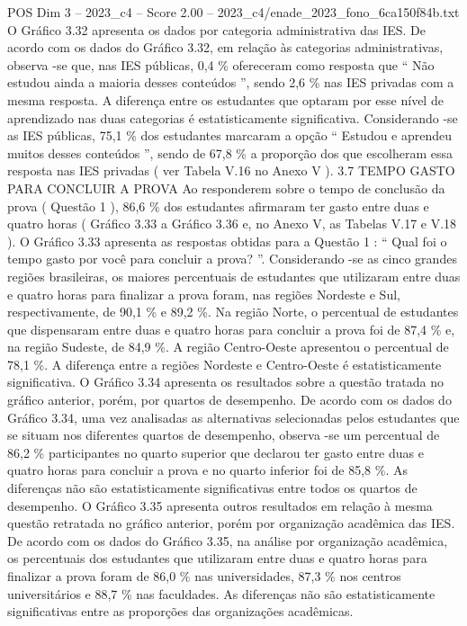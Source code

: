 \begin{textsample}{POS Dim 3 – 2023\_c4 – Score 2.00 – 2023\_c4/enade\_2023\_fono\_6ca150f84b.txt}
O Gráfico 3.32 apresenta os dados por categoria administrativa das IES.
De acordo com os dados do Gráfico 3.32, em relação às categorias administrativas, observa -se que, nas IES públicas, 0,4 \% ofereceram como resposta que “ Não estudou ainda a maioria desses conteúdos ”, sendo 2,6 \% nas IES privadas com a mesma resposta.
A diferença entre os estudantes que optaram por esse nível de aprendizado nas duas categorias é estatisticamente significativa.
Considerando -se as IES públicas, 75,1 \% dos estudantes marcaram a opção “ Estudou e aprendeu muitos desses conteúdos ”, sendo de 67,8 \% a proporção dos que escolheram essa resposta nas IES privadas ( ver Tabela V.16 no Anexo V ). 3.7 TEMPO GASTO PARA CONCLUIR A PROVA Ao responderem sobre o tempo de conclusão da prova ( Questão 1 ), 86,6 \% dos estudantes afirmaram ter gasto entre duas e quatro horas ( Gráfico 3.33 a Gráfico 3.36 e, no Anexo V, as Tabelas V.17 e V.18 ).
O Gráfico 3.33 apresenta as respostas obtidas para a Questão 1 : “ Qual foi o tempo gasto por você para concluir a prova? ”.
Considerando -se as cinco grandes regiões brasileiras, os maiores percentuais de estudantes que utilizaram entre duas e quatro horas para finalizar a prova foram, nas regiões Nordeste e Sul, respectivamente, de 90,1 \% e 89,2 \%.
Na região Norte, o percentual de estudantes que dispensaram entre duas e quatro horas para concluir a prova foi de 87,4 \% e, na região Sudeste, de 84,9 \%.
A região Centro-Oeste apresentou o percentual de 78,1 \%.
A diferença entre a regiões Nordeste e Centro-Oeste é estatisticamente significativa.
O Gráfico 3.34 apresenta os resultados sobre a questão tratada no gráfico anterior, porém, por quartos de desempenho.
De acordo com os dados do Gráfico 3.34, uma vez analisadas as alternativas selecionadas pelos estudantes que se situam nos diferentes quartos de desempenho, observa -se um percentual de 86,2 \% participantes no quarto superior que declarou ter gasto entre duas e quatro horas para concluir a prova e no quarto inferior foi de 85,8 \%.
As diferenças não são estatisticamente significativas entre todos os quartos de desempenho.
O Gráfico 3.35 apresenta outros resultados em relação à mesma questão retratada no gráfico anterior, porém por organização acadêmica das IES.
De acordo com os dados do Gráfico 3.35, na análise por organização acadêmica, os percentuais dos estudantes que utilizaram entre duas e quatro horas para finalizar a prova foram de 86,0 \% nas universidades, 87,3 \% nos centros universitários e 88,7 \% nas faculdades.
As diferenças não são estatisticamente significativas entre as proporções das organizações acadêmicas.

\end{textsample}

